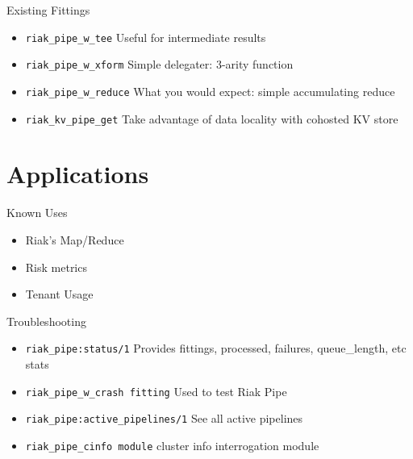 \documentclass[compress]{beamer}
\begin{document}
\begin{frame}{Existing Fittings}
  \begin{itemize}
    \item{\Large{\tt{riak\_pipe\_w\_tee}} \newline \small{Useful for intermediate results}} \newline
    \item{\Large{\tt{riak\_pipe\_w\_xform}} \newline \small{Simple delegater: 3-arity function}} \newline
    \item{\Large{\tt{riak\_pipe\_w\_reduce}} \newline \small{What you would expect: simple accumulating reduce}} \newline
    \item{\Large{\tt{riak\_kv\_pipe\_get}} \newline \small{Take advantage of data locality with cohosted KV store}}
  \end{itemize}
\end{frame}

\section{Applications}

\begin{frame}{Known Uses}
\begin{itemize}
  \item \Large{Riak's Map/Reduce}
  \item \Large{Risk metrics}
  \item \Large{Tenant Usage}
\end{itemize}
\end{frame}

\begin{frame}{Troubleshooting}
  \begin{itemize}
    \item{\Large{\tt{riak\_pipe:status/1}} \newline \small{Provides fittings, processed, failures, queue\_length, etc stats}}
    \item{\Large{\tt{riak\_pipe\_w\_crash} fitting} \newline \small{Used to test Riak Pipe}}
    \item{\Large{\tt{riak\_pipe:active\_pipelines/1}} \newline \small{See all active pipelines}}
    \item{\Large{\tt{riak\_pipe\_cinfo module}} \newline \small{cluster info interrogation module}}
  \end{itemize}
\end{frame}
\end{document}
